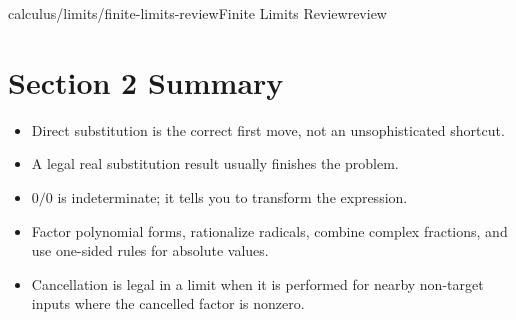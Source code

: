 \begin{webpage}{calculus/limits/finite-limits-review}{Finite Limits Review}{review}
\section*{Section 2 Summary}

\begin{bgsummary}
\begin{itemize}
  \item Direct substitution is the correct first move, not an unsophisticated shortcut.
  \item A legal real substitution result usually finishes the problem.
  \item \(0/0\) is indeterminate; it tells you to transform the expression.
  \item Factor polynomial forms, rationalize radicals, combine complex fractions, and use one-sided rules for absolute values.
  \item Cancellation is legal in a limit when it is performed for nearby non-target inputs where the cancelled factor is nonzero.
\end{itemize}
\end{bgsummary}
\end{webpage}

